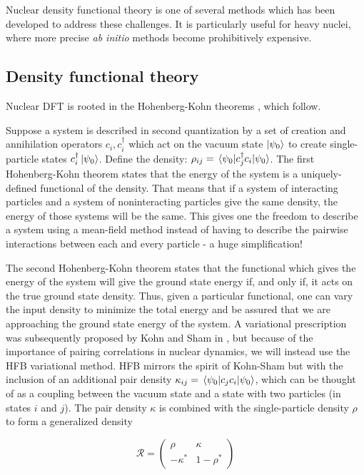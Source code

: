 Nuclear density functional theory is one of several methods which has been developed to address these challenges. It is particularly useful for heavy nuclei, where more precise \textit{ab initio} methods become prohibitively expensive.

\subsection{Density functional theory}\label{sect:DFT}
Nuclear DFT is rooted in the Hohenberg-Kohn theorems \cite{Hohenberg1964}, which follow.

Suppose a system is described in second quantization by a set of creation and annihilation operators $c_i, c_i^\dagger$ which act on the vacuum state $\ket{\psi_0}$ to create single-particle states $c_i^\dagger\ket{\psi_0}$. Define the density: $\rho_{ij} = \expval{c_j^\dagger c_i}{\psi_0}$. The first Hohenberg-Kohn theorem states that the energy of the system is a uniquely-defined functional of the density. That means that if a system of interacting particles and a system of noninteracting particles give the same density, the energy of those systems will be the same. This gives one the freedom to describe a system using a mean-field method instead of having to describe the pairwise interactions between each and every particle - a huge simplification!

The second Hohenberg-Kohn theorem states that the functional which gives the energy of the system will give the ground state energy if, and only if, it acts on the true ground state density. Thus, given a particular functional, one can vary the input density to minimize the total energy and be assured that we are approaching the ground state energy of the system. A variational prescription was subsequently proposed by Kohn and Sham in \cite{Kohn1965}, but because of the importance of pairing correlations in nuclear dynamics, we will instead use the HFB variational method. HFB mirrors the spirit of Kohn-Sham but with the inclusion of an additional pair density $\kappa_{ij} = \expval{c_jc_i}{\psi_0}$, which can be thought of as a coupling between the vacuum state and a state with two particles (in states $i$ and $j$). The pair density $\kappa$ is combined with the single-particle density $\rho$ to form a generalized density

\begin{equation}
\mathcal{R} = \left(\begin{array}{cc}
\rho & \kappa \\
-\kappa^* & 1-\rho^*
\end{array}\right)
\end{equation}


